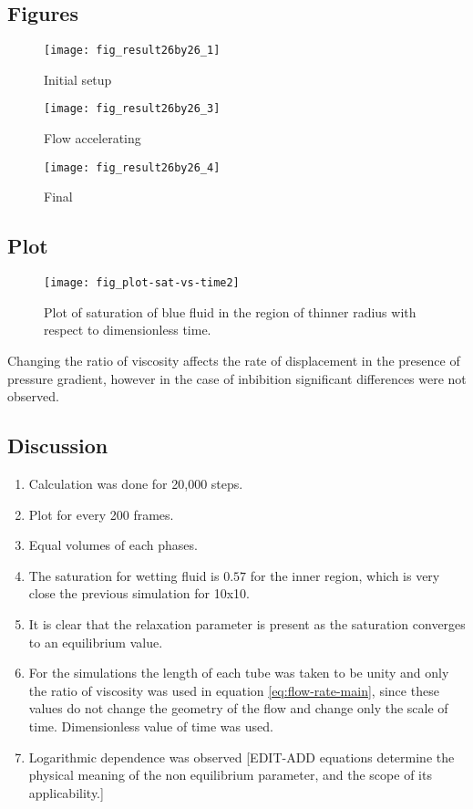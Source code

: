 \subsection{Figures}
	\begin{figure}[H]
		\texttt{[image: fig\_result26by26\_1]}
		\caption{Initial setup}
	\end{figure}
	
	
	\begin{figure}[H]
		\texttt{[image: fig\_result26by26\_3]}
		\caption{Flow accelerating}
	\end{figure}
	
	\begin{figure}[H]
		\texttt{[image: fig\_result26by26\_4]}
		\caption{Final}
	\end{figure}

\subsection{Plot}
	\begin{figure}[H]
		\centering
		\texttt{[image: fig\_plot-sat-vs-time2]}
		\caption{Plot of saturation of blue fluid in the region of thinner radius with respect to dimensionless time.}
	\end{figure}
	
	Changing the ratio of viscosity affects the rate of displacement in the presence of pressure gradient, however in the case of inbibition significant differences were not observed.
	
\subsection{Discussion}
	\begin{enumerate}
		\item Calculation was done for 20,000 steps.
		\item Plot for every 200 frames.
		\item Equal volumes of each phases.
		\item The saturation for wetting fluid is $0.57$ for the inner region, which is very close the previous simulation for 10x10. 
		\item It is clear that the relaxation parameter is present as the saturation converges to an equilibrium value.
		\item For the simulations the length of each tube was taken to be unity and only the ratio of viscosity was used in equation \ref{eq:flow-rate-main}, since these values do not change the geometry of the flow and change only the scale of time. Dimensionless value of time was used.
		\item Logarithmic dependence was observed [EDIT-ADD equations determine the physical meaning of the non equilibrium parameter, and the scope of its applicability.]
	\end{enumerate}
		

		
		
	
